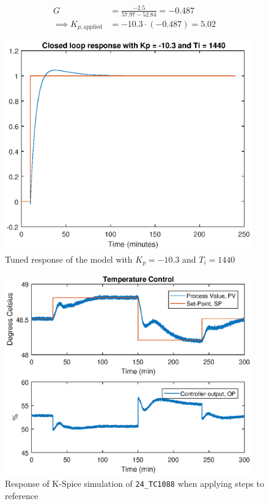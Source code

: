 \begin{equation} \label{eq:tc1088_internal}
	\begin{aligned}
		G &= \frac{-2.5}{57.97 - 52.84} = -0.487\\
		\implies K_{p,\text{applied}} &= -10.3\cdot(-0.487) = 5.02
	\end{aligned}
\end{equation}

\begin{figure}[ht!]
	\centering
	\includegraphics[width=0.95\textwidth]{fig/identification/tc1088_tuned.eps}
	\caption{Tuned response of the model with $K_p = -10.3$ and $T_i = 1440$}
	\label{fig:tc1088_tuned_model}
\end{figure}

\begin{figure}[ht!]
	\centering
	\includegraphics[width=0.95\textwidth]{fig/identification/tc1088_tuned_kspice.eps}
	\caption{Response of K-Spice simulation of \texttt{24\_TC1088} when applying steps to reference}
	\label{fig:tc1088_tuned_kspice}
\end{figure}

